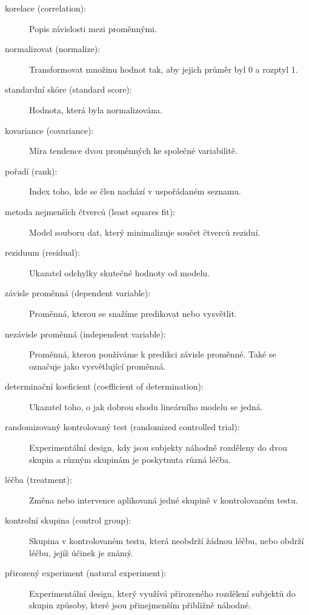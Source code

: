 \documentclass[12pt]{book}
\begin{document}
\begin{description}

\item[korelace (correlation):] Popis závislosti mezi proměnnými.

\item[normalizovat (normalize):] Transformovat množinu hodnot tak, aby jejich průměr byl 0 a rozptyl 1.

\item[standardní skóre (standard score):] Hodnota, která byla normalizována.

\item[kovariance (covariance):] Míra tendence dvou proměnných ke společné variabilitě.

\item[pořadí (rank):] Index toho, kde se člen nachází v uspořádaném seznamu.

\item[metoda nejmenších čtverců (least squares fit):] Model souboru dat, který minimalizuje součet čtverců reziduí.

\item[reziduum (residual):] Ukazatel odchylky skutečné hodnoty od modelu.

\item[závisle proměnná (dependent variable):] Proměnná, kterou se snažíme predikovat nebo vysvětlit.

\item[nezávisle proměnná (independent variable):] Proměnná, kterou používáme k predikci závisle proměnné. Také se označuje jako vysvětlující proměnná.

\item[determinační koeficient (coefficient of determination):] Ukazatel toho, o jak dobrou shodu lineárního modelu se jedná.

\item[randomizovaný kontrolovaný test (randomized controlled trial):] Experimentální design, kdy jsou subjekty náhodně rozděleny do dvou skupin a různým skupinám je poskytnuta různá léčba.

\item[léčba (treatment):] Změna nebo intervence aplikovaná jedné skupině v kontrolovaném testu.

\item[kontrolní skupina (control group):] Skupina v kontrolovaném testu, která neobdrží žádnou léčbu, nebo obdrží léčbu, jejíž účinek je známý.

\item[přirozený experiment (natural experiment):] Experimentální design, který využívá přirozeného rozdělení subjektů do skupin způsoby, které jsou přinejmenším přibližně náhodné.

\end{description}


\printindex

\clearemptydoublepage
\end{document}
